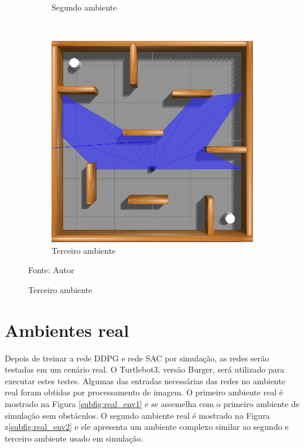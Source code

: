 \begin{figure}[H]
\begin{center}
\begin{subfigure}[b]{0.3\textwidth}
        \caption{Segundo ambiente}
        \label{subfig:simulated_env2}
    \end{subfigure}
    ~ %
    \begin{subfigure}[b]{0.3\textwidth}
        \includegraphics[width=\textwidth]{imagens/simulated_envs/amb3.png}
        \caption{Terceiro ambiente}
        \label{subfig:simulated_env3}
    \end{subfigure}\label{fig:environments}
    \end{center}
\small{Fonte: Autor}
\end{figure}

\section{Ambientes real}

Depois de treinar a rede DDPG e rede SAC por simulação, as redes serão testadas em um cenário real.
O Turtlebot3, versão Burger, será utilizado para executar estes testes.
Algumas das entradas necessárias das redes no ambiente real foram obtidas por processamento de imagem.
O primeiro ambiente real é mostrado na Figura \ref{subfig:real_env1} e se assemelha com o primeiro ambiente de simulação sem obstáculos.
O segundo ambiente real é mostrado na Figura z\ref{subfig:real_env2} e ele apresenta um ambiente complexo similar ao segundo e terceiro ambiente usado em simulação.


